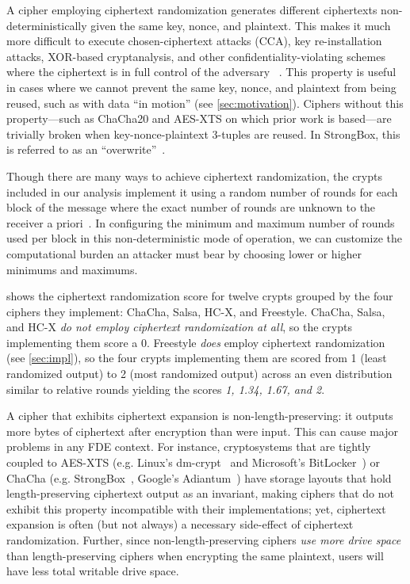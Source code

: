 
 A cipher employing ciphertext
randomization generates different ciphertexts non-deterministically given the
same key, nonce, and plaintext. This makes it much more difficult to execute
chosen-ciphertext attacks (CCA), key re-installation attacks, XOR-based
cryptanalysis, and other confidentiality-violating schemes where the ciphertext
is in full control of the adversary ~\cite{Freestyle}. This property is useful
in cases where we cannot prevent the same key, nonce, and plaintext from being
reused, such as with data ``in motion'' (see \cref{sec:motivation}). Ciphers
without this property---such as ChaCha20 and AES-XTS on which prior work is
based---are trivially broken when key-nonce-plaintext 3-tuples are reused. In
StrongBox, this is referred to as an ``overwrite''~\cite{StrongBox}.

Though there are many ways to achieve ciphertext randomization, the crypts
included in our analysis implement it using a random number of rounds for each
block of the message where the exact number of rounds are unknown to the
receiver a priori~\cite{Freestyle}. In configuring the minimum and maximum
number of rounds used per block in this non-deterministic mode of operation, we
can customize the computational burden an attacker must bear by choosing lower
or higher minimums and maximums.

 shows the ciphertext randomization score for twelve
crypts grouped by the four ciphers they implement: ChaCha, Salsa, HC-X, and
Freestyle. ChaCha, Salsa, and HC-X {\em do not employ ciphertext randomization
at all}, so the crypts implementing them score a 0. Freestyle {\em does} employ
ciphertext randomization (see \cref{sec:impl}), so the four crypts implementing
them are scored from 1 (least randomized output) to 2 (most randomized output)
across an even distribution similar to relative rounds yielding the scores {\em
1, 1.34, 1.67, and 2}.


 A cipher that exhibits ciphertext
expansion is non-length-preserving: it outputs more bytes of ciphertext after
encryption than were input. This can cause major problems in any FDE context.
For instance, cryptosystems that are tightly coupled to AES-XTS (e.g. Linux's
dm-crypt~\cite{dmcrypt} and Microsoft's BitLocker~\cite{bitlocker1}) or ChaCha
(e.g. StrongBox~\cite{StrongBox}, Google's Adiantum~\cite{Adiantum}) have
storage layouts that hold length-preserving ciphertext output as an invariant,
making ciphers that do not exhibit this property incompatible with their
implementations; yet, ciphertext expansion is often (but not always) a necessary
side-effect of ciphertext randomization. Further, since non-length-preserving
ciphers {\em use more drive space} than length-preserving ciphers when
encrypting the same plaintext, users will have less total writable drive space.


